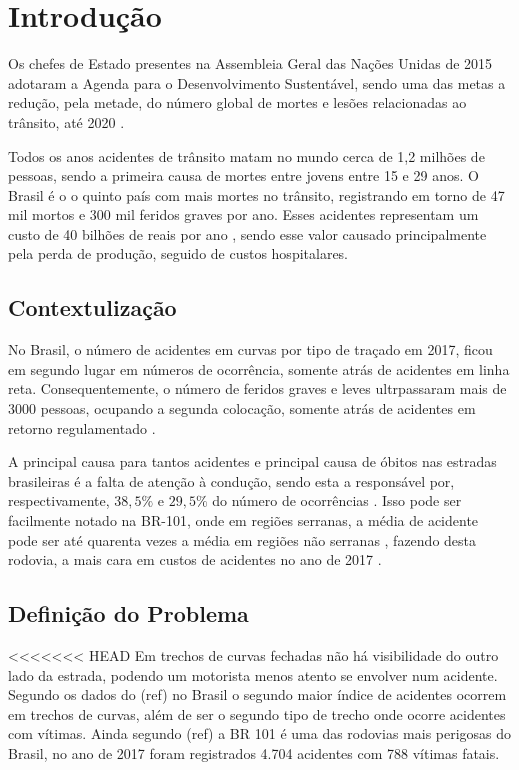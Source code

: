 \chapter{Introdução}

Os chefes de Estado presentes na Assembleia Geral das Nações Unidas de 2015 adotaram a Agenda para o Desenvolvimento Sustentável, sendo uma das metas a redução, pela metade, do número global de mortes e lesões relacionadas ao trânsito, até 2020 \cite{relatorio_oms}.

Todos os anos acidentes de trânsito matam no mundo cerca de 1,2 milhões de pessoas, sendo a primeira causa de mortes entre jovens entre 15 e 29 anos. O Brasil é o o quinto país com mais mortes no trânsito, registrando em torno de 47 mil mortos e 300 mil feridos graves por ano. Esses acidentes representam um custo de 40 bilhões de reais por ano \cite{relatorio_ipea}, sendo esse valor causado principalmente pela perda de produção, seguido de custos hospitalares.

\section{Contextulização}

No Brasil, o número de acidentes em curvas por tipo de traçado em 2017, ficou em segundo lugar em números de ocorrência, somente atrás de acidentes em linha reta. Consequentemente, o número de feridos graves e leves ultrpassaram mais de 3000 pessoas, ocupando a segunda colocação, somente atrás de acidentes em retorno regulamentado \cite{anuario_rodoviario}.

A principal causa para tantos acidentes e principal causa de óbitos nas estradas brasileiras é a falta de atenção à condução, sendo esta a responsável por, respectivamente, $38,5\%$ e $29,5\%$ do número de ocorrências \cite{anuario_rodoviario}. Isso pode ser facilmente notado na BR-101, onde em regiões serranas, a média de acidente pode ser até quarenta vezes a média em regiões não serranas \cite{acidentes}, fazendo desta rodovia, a mais cara em custos de acidentes no ano de 2017 \cite{anuario_rodoviario}.


\section{Definição do Problema}

<<<<<<< HEAD
Em trechos de curvas fechadas não há visibilidade do outro lado da estrada, podendo um motorista menos atento se envolver num acidente. Segundo os dados do (ref) no Brasil o segundo maior índice de acidentes ocorrem em trechos de curvas, além de ser o segundo tipo de trecho onde ocorre acidentes com vítimas. Ainda segundo (ref) a BR 101 é uma das rodovias mais perigosas do Brasil, no ano de 2017 foram registrados 4.704 acidentes com 788 vítimas fatais. 


